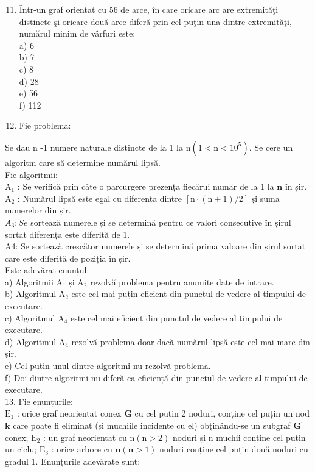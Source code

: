 \begin{enumerate}
  \setcounter{enumi}{10}
  \item Într-un graf orientat cu 56 de arce, în care oricare arc are extremităţi distincte şi oricare două arce diferă prin cel puţin una dintre extremităţi, numărul minim de vârfuri este:\\
a) 6\\
b) 7\\
c) 8\\
d) 28\\
e) 56\\
f) 112
  \item Fie problema:
\end{enumerate}

Se dau n -1 numere naturale distincte de la 1 la $\mathrm{n}\left(1<\mathrm{n}<10^{5}\right)$. Se cere un algoritm care să determine numărul lipsă.\\
Fie algoritmii:\\
$\mathrm{A}_{1}$ : Se verifică prin câte o parcurgere prezența fiecărui număr de la 1 la $\mathbf{n}$ în șir.\\
$\mathrm{A}_{2}$ : Numărul lipsă este egal cu diferența dintre $[\mathrm{n} \cdot(\mathrm{n}+1) / 2]$ și suma numerelor din șir.\\
$A_{3}: S e$ sortează numerele și se determină pentru ce valori consecutive în șirul sortat diferența este diferită de 1.\\
A4: Se sortează crescător numerele și se determină prima valoare din șirul sortat care este diferită de poziția în șir.\\
Este adevărat enunțul:\\
a) Algoritmii $\mathrm{A}_{1}$ și $\mathrm{A}_{2}$ rezolvă problema pentru anumite date de intrare.\\
b) Algoritmul $\mathrm{A}_{2}$ este cel mai puțin eficient din punctul de vedere al timpului de executare.\\
c) Algoritmul $\mathrm{A}_{4}$ este cel mai eficient din punctul de vedere al timpului de executare.\\
d) Algoritmul $\mathrm{A}_{4}$ rezolvă problema doar dacă numărul lipsă este cel mai mare din șir.\\
e) Cel puțin unul dintre algoritmi nu rezolvă problema.\\
f) Doi dintre algoritmi nu diferă ca eficiență din punctul de vedere al timpului de executare.\\
13. Fie enunțurile:\\
$\mathrm{E}_{1}$ : orice graf neorientat conex $\mathbf{G}$ cu cel puțin 2 noduri, conține cel puțin un nod $\mathbf{k}$ care poate fi eliminat (și muchiile incidente cu el) obținându-se un subgraf $\mathbf{G}^{\prime}$ conex; $\mathrm{E}_{2}$ : un graf neorientat cu $\mathrm{n}(\mathrm{n}>2)$ noduri și n muchii conține cel puțin un ciclu; $\mathrm{E}_{3}$ : orice arbore cu $\mathbf{n}(\mathbf{n}>1)$ noduri conține cel puțin două noduri cu gradul 1. Enunțurile adevărate sunt:\\
